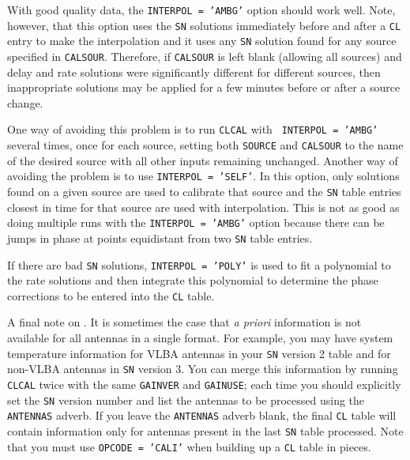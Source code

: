 With good quality data, the {\tt INTERPOL = 'AMBG'} option should work
well.  Note, however, that this option uses the {\tt SN} solutions
immediately before and after a {\tt CL} entry to make the
interpolation and it uses any {\tt SN} solution found for any source
specified in {\tt CALSOUR}\@.  Therefore, if {\tt CALSOUR} is left
blank (allowing all sources) and delay and rate solutions were
significantly different for different sources, then inappropriate
solutions may be applied for a few minutes before or after a source
change.

One way of avoiding this problem is to run {\tt CLCAL} with {\tt
INTERPOL = 'AMBG'} several times, once for each source, setting both
{\tt SOURCE} and {\tt CALSOUR} to the name of the desired source with
all other inputs remaining unchanged.  Another way of avoiding the
problem is to use {\tt INTERPOL = 'SELF'}\@.  In this option, only
solutions found on a given source are used to calibrate that source
and the {\tt SN} table entries closest in time for that source are
used with interpolation.  This is not as good as doing multiple
runs with the {\tt INTERPOL = 'AMBG'} option because there can be
jumps in phase at points equidistant from two {\tt SN} table
entries.

If there are bad {\tt SN} solutions, {\tt INTERPOL = 'POLY'} is used
to fit a polynomial to the rate solutions and then integrate this
polynomial to determine the phase corrections to be entered into the
{\tt CL} table.

A final note on {\tt {}}.  It is sometimes the case that
{\it a priori\/} information is not available for all antennas in a
single format.  For example, you may have system temperature
information for VLBA antennas in your {\tt SN} version 2 table and for
non-VLBA antennas in {\tt SN} version 3.  You can merge this
information by running {\tt CLCAL} twice with the same {\tt GAINVER}
and {\tt GAINUSE}; each time you should explicitly set the {\tt SN}
version number and list the antennas to be processed using the {\tt
ANTENNAS} adverb.  If you leave the {\tt ANTENNAS} adverb blank,  the
final {\tt CL} table will contain information only for antennas
present in the last {\tt SN} table processed.  Note that you must use
{\tt OPCODE = 'CALI'} when building up a {\tt CL} table in pieces.


